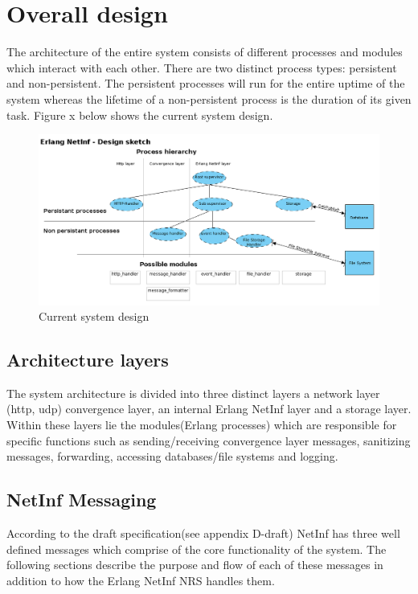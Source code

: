 \section {Overall design}

The architecture of the entire system consists of different processes and modules which interact with each other. There are two distinct process types: persistent and non-persistent. The persistent processes will run for the entire uptime of the system whereas the lifetime of a non-persistent process is the duration of its given task. Figure x below shows the current system design.

\begin{figure}[h!]
	\centering
\includegraphics[scale=0.6]{./img/process_hierarchy.png}
\caption{Current system design}
\end{figure}

\subsection{Architecture layers}

The system architecture is divided into three distinct layers a network layer (http, udp) convergence layer, an internal Erlang NetInf layer and a storage layer. Within these layers lie the modules(Erlang processes) which are responsible for specific functions such as sending/receiving convergence layer messages, sanitizing messages, forwarding, accessing databases/file systems and logging.

\subsection{NetInf Messaging}

According to the draft specification(see appendix D-draft) NetInf has three well defined messages which comprise of the core functionality of the system. The following sections describe the purpose and flow of each of these messages in addition to how the Erlang NetInf NRS handles them.

